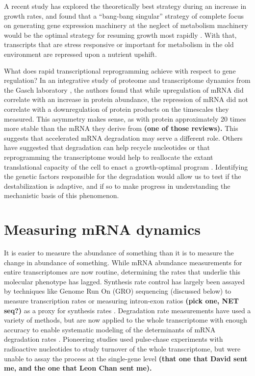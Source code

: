 A recent study has
explored the theoretically best strategy during an increase in growth
rates, and found that a “bang-bang singular” strategy of complete
focus on generating gene expression machinery at the neglect of
metabolism machinery would be the optimal strategy for resuming growth
most rapidly 
\parencite{giordano2016dynamical}. With that, transcripts that are
stress responsive or important for metabolism in the old environment
are repressed upon a nutrient upshift.  


What does rapid transcriptional reprogramming achieve with respect to gene regulation?
In an integrative study of proteome and transcriptome dynamics from
the Gasch laboratory 
\parencite{lee2011dynamic}, the authors found that while
upregulation of mRNA did correlate with an increase in protein
abundance, the repression of mRNA did not correlate with a
downregulation of protein products on the timescales they measured.
This asymmetry makes sense, as with protein approximately 20 times
more stable than the mRNA they derive from 
\textbf{(one of those reviews).}
This suggests that accelerated mRNA degradation may serve a different
role. Others have suggested that degradation can help recycle
nucleotides 
\parencite{kresnowati2006transcriptome}
or that reprogramming the
transcriptome would help to reallocate the extant translational
capacity of the cell to enact a growth-optimal program 
\parencite{kief1981coordinate,giordano2016dynamical,shachrai2010cost}. 
Identifying
the genetic factors responsible for the degradation would allow us to
test if the destabilization is adaptive, and if so to make progress in
understanding the mechanistic basis of this phenomenon.

\section{Measuring mRNA dynamics}

It is easier to measure the abundance of something than
it is to measure the change in abundance of something. While mRNA
abundance measurements for entire transcriptomes are now routine,
determining the rates that underlie this molecular phenotype has
lagged. Synthesis rate control has largely been assayed by techniques
like Genome Run On (GRO) sequencing (discussed below) to measure
transcription rates or measuring intron-exon ratios 
\textbf{(pick one, NET seq?)}
as a proxy for synthesis rates 
\parencite{perez2013eukaryotic}.
Degradation rate measurements have used a variety of methods, but are
now applied to the whole transcriptome with enough accuracy to enable
systematic modeling of the determinants of mRNA degradation rates
\parencite{perez2013eukaryotic,neymotin2016multiple,cheng2017cis}.
Pioneering studies used pulse-chase experiments with radioactive
nucleotides to study turnover of the whole transcriptome, but were
unable to assay the process at the single-gene level 
\textbf{(that one that
David sent me, and the one that Leon Chan sent me).}

